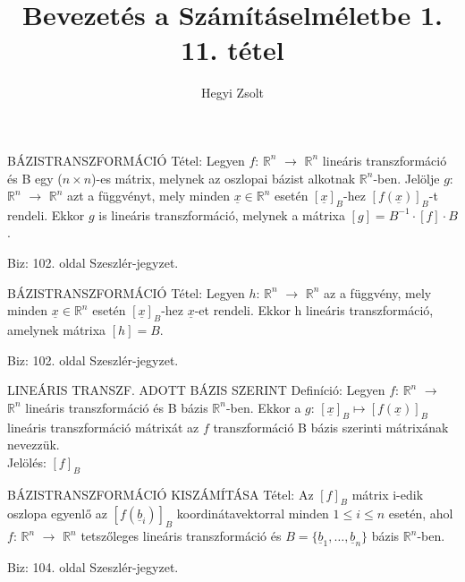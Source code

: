 \documentclass[]{article}
\title{Bevezetés a Számításelméletbe 1.\\{\large 11. tétel}}
\author{Hegyi Zsolt}
\newcommand{\R}{\mathbb{R}}
\newcommand{\Rn}[1]{$\mathbb{R}^{#1}$}
\newcommand{\Und}[1]{\underline{#1}}
\begin{document}
\maketitle{}
\begin{framed}
BÁZISTRANSZFORMÁCIÓ Tétel: Legyen $f$: \Rn{n} $\rightarrow$ \Rn{n} lineáris transzformáció és B egy ($n \times n$)-es mátrix, melynek az oszlopai bázist alkotnak \Rn{n}-ben. Jelölje $g$: \Rn{n} $\rightarrow$ \Rn{n} azt a függvényt, mely minden $\Und{x} \in \R^n$ esetén $[\Und{x}]_B$-hez $[f(\Und{x})]_B$-t rendeli. Ekkor $g$ is lineáris transzformáció, melynek a mátrixa $[g] = B^{-1} \cdot [f] \cdot B$.
\end{framed}
\begin{leftbar}
Biz: 102. oldal Szeszlér-jegyzet.
\end{leftbar}
\begin{framed}
BÁZISTRANSZFORMÁCIÓ Tétel: Legyen $h$: \Rn{n} $\rightarrow$ \Rn{n} az a függvény, mely minden $\Und{x} \in \R^n$ esetén $[\Und{x}]_B$-hez $\Und{x}$-et rendeli. Ekkor h lineáris transzformáció, amelynek mátrixa $[h] = B$.
\end{framed}
\begin{leftbar}
Biz: 102. oldal Szeszlér-jegyzet.
\end{leftbar}
\begin{shaded}
LINEÁRIS TRANSZF. ADOTT BÁZIS SZERINT Definíció: Legyen $f$: \Rn{n} $\rightarrow$ \Rn{n} lineáris transzformáció és B bázis \Rn{n}-ben. Ekkor a $g$: $[\Und{x}]_B \mapsto [f(\Und{x})]_B$ lineáris transzformáció mátrixát az $f$ transzformáció B bázis szerinti mátrixának nevezzük.\\
Jelölés: $[f]_B$
\end{shaded}
\begin{framed}
BÁZISTRANSZFORMÁCIÓ KISZÁMÍTÁSA Tétel: Az $[f]_B$ mátrix i-edik oszlopa egyenlő az $[f(\Und{b}_i)]_B$ koordinátavektorral minden $1 \leq i \leq n$ esetén, ahol $f$: \Rn{n} $\rightarrow$ \Rn{n} tetszőleges lineáris transzformáció és $B = \{\Und{b}_1, \ldots, \Und{b}_n\}$ bázis \Rn{n}-ben.
\end{framed}
\begin{leftbar}
Biz: 104. oldal Szeszlér-jegyzet.
\end{leftbar}
\end{document}
